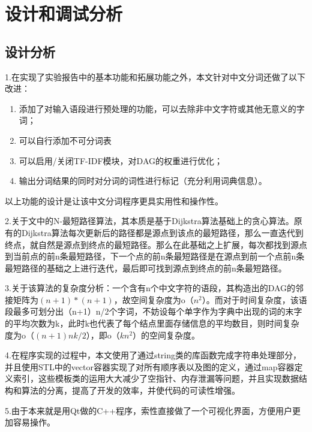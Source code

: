 \documentclass[UTF8]{ctexart}
\begin{document}
\section{设计和调试分析}
\subsection{设计分析}
	1.在实现了实验报告中的基本功能和拓展功能之外，本文针对中文分词还做了以下改进：\par
\begin{enumerate}[1)]
\item 添加了对输入语段进行预处理的功能，可以去除非中文字符或其他无意义的字词；
\item 可以自行添加不可分词表
\item 可以启用/关闭TF-IDF模块，对DAG的权重进行优化；
\item 输出分词结果的同时对分词的词性进行标记（充分利用词典信息）。
\end{enumerate}\par
	以上功能的设计是让该中文分词程序更具实用性和操作性。\par
	2.关于文中的N-最短路径算法，其本质是基于Dijkstra算法基础上的贪心算法。原有的Dijkstra算法每次更新后的路径都是源点到该点的最短路径，那么一直迭代到终点，就自然是源点到终点的最短路径。那么在此基础之上扩展，每次都找到源点到当前点的前n条最短路径，下一个点的前n条最短路径是在源点到前一个点前n条最短路径的基础之上进行迭代，最后即可找到源点到终点的前n条最短路径。\par
	3.关于该算法的复杂度分析：一个含有n个中文字符的语段，其构造出的DAG的邻接矩阵为$(n+1)*(n+1)$，故空间复杂度为o（$n^2$）。而对于时间复杂度，该语段最多可划分出（n+1）n/2个字词，不妨设每个单字作为字典中出现的词的末字的平均次数为k，此时k也代表了每个结点里面存储信息的平均数目，则时间复杂度为o（$(n+1)nk/2$），即o（$kn^2$）的空间复杂度。\par
	4.在程序实现的过程中，本文使用了通过string类的库函数完成字符串处理部分，并且使用STL中的vector容器实现了对所有顺序表以及图的定义，通过map容器定义索引，这些模板类的运用大大减少了空指针、内存泄漏等问题，并且实现数据结构和算法的分离，提高了开发的效率，并使代码的可读性增强。\par
	5.由于本来就是用Qt做的C++程序，索性直接做了一个可视化界面，方便用户更加容易操作。
\end{document}
